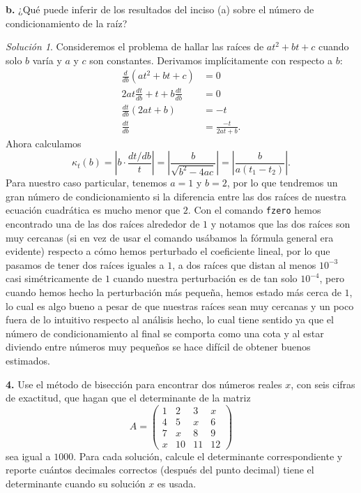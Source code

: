 \documentclass{article}
\newenvironment{statement}[1]{\smallskip\noindent\color[rgb]{1.00,0.00,0.50} {\bf #1.}}{}
\theoremstyle{definition}
\theoremstyle{remark}
\newtheorem*{solution}{Soluci\'on}
\begin{document}
\begin{statement}{b}
  ¿Qu\'e puede inferir de los resultados del inciso (a) sobre el n\'umero de
  condicionamiento de la ra\'iz?
\end{statement}

\begin{solution}
  Consideremos el problema de hallar las ra\'ices de $at^2 + bt + c$ cuando
  solo $b$ var\'ia y $a$ y $c$ son constantes. Derivamos impl\'icitamente con
  respecto a $b$:
  \begin{align*}
    \frac{d}{db} (at^2 + bt + c) &= 0\\
    2at\frac{dt}{db} + t + b \frac{dt}{db} &= 0\\
    \frac{dt}{db}(2at + b) &= -t\\
    \frac{dt}{db} &= \frac{-t}{2at + b}.
  \end{align*}
  Ahora calculamos
  \[
    \kappa_t(b) = \left|b \cdot \frac{dt / db}{t}\right| = \left|\frac{b}{\sqrt{b^2 - 4ac}}\right|
    = \left|\frac{b}{a (t_1 - t_2)}\right|.
  \]
  Para nuestro caso particular, tenemos $a = 1$ y $b = 2$, por lo que tendremos
  un gran n\'umero de condicionamiento si la diferencia entre las dos ra\'ices de
  nuestra ecuaci\'on cuadr\'atica es mucho menor que $2$. Con el comando \texttt{fzero}
  hemos encontrado una de las dos ra\'ices alrededor de $1$ y notamos que las dos ra\'ices
  son muy cercanas (si en vez de usar el comando us\'abamos la f\'ormula general era evidente)
  respecto a c\'omo hemos perturbado el coeficiente lineal, por lo que pasamos de tener
  dos ra\'ices iguales a $1$, a dos ra\'ices que distan al menos $10^{-3}$ casi sim\'etricamente de $1$
  cuando nuestra perturbaci\'on es de tan solo $10^{-4}$, pero cuando hemos hecho la
  perturbaci\'on m\'as peque\~na, hemos estado m\'as cerca de $1$, lo cual es algo bueno
  a pesar de que nuestras ra\'ices sean muy cercanas y un poco fuera de lo intuitivo
  respecto al an\'alisis hecho, lo cual tiene sentido ya que el n\'umero de condicionamiento al final se
  comporta como una cota y al estar diviendo entre n\'umeros muy peque\~nos se hace dif\'icil
  de obtener buenos estimados.
\end{solution}

\begin{statement}{4}
  Use el m\'etodo de bisecci\'on para encontrar dos n\'umeros reales $x$, con
  seis cifras de exactitud, que hagan que el determinante de la matriz
  \[
    A = \begin{pmatrix}
      1 & 2 & 3 & x \\
      4 & 5 & x & 6 \\
      7 & x & 8 & 9 \\
      x & 10 & 11 & 12
    \end{pmatrix}  
  \]
  sea igual a $1000$. Para cada soluci\'on, calcule el determinante
  correspondiente y reporte cu\'antos decimales correctos (despu\'es del punto
  decimal) tiene el determinante cuando su soluci\'on $x$ es usada.
\end{statement}
\end{document}
